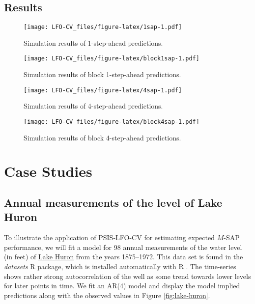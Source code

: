 \documentclass[american,]{article}
\begin{document}
\hypertarget{results}{%
\subsection{Results}\label{results}}

\begin{figure}
\centering
\texttt{[image: LFO-CV\_files/figure-latex/1sap-1.pdf]}
\caption{Simulation results of 1-step-ahead predictions.}
\end{figure}

\begin{figure}
\centering
\texttt{[image: LFO-CV\_files/figure-latex/block1sap-1.pdf]}
\caption{Simulation results of block 1-step-ahead predictions.}
\end{figure}

\begin{figure}
\centering
\texttt{[image: LFO-CV\_files/figure-latex/4sap-1.pdf]}
\caption{Simulation results of 4-step-ahead predictions.}
\end{figure}

\begin{figure}
\centering
\texttt{[image: LFO-CV\_files/figure-latex/block4sap-1.pdf]}
\caption{Simulation results of block 4-step-ahead predictions.}
\end{figure}

\hypertarget{case-studies}{%
\section{Case Studies}\label{case-studies}}

\hypertarget{annual-measurements-of-the-level-of-lake-huron}{%
\subsection{Annual measurements of the level of Lake
Huron}\label{annual-measurements-of-the-level-of-lake-huron}}

To illustrate the application of PSIS-LFO-CV for estimating expected
\(M\)-SAP performance, we will fit a model for 98 annual measurements of
the water level (in feet) of
\href{https://en.wikipedia.org/wiki/Lake_Huron}{Lake Huron} from the
years 1875--1972. This data set is found in the \emph{datasets} R
package, which is installed automatically with R \citep{R2018}. The
time-series shows rather strong autocorrelation of the well as some
trend towards lower levels for later points in time. We fit an AR(4)
model and display the model implied predictions along with the observed
values in Figure \ref{fig:lake-huron}.
\end{document}
